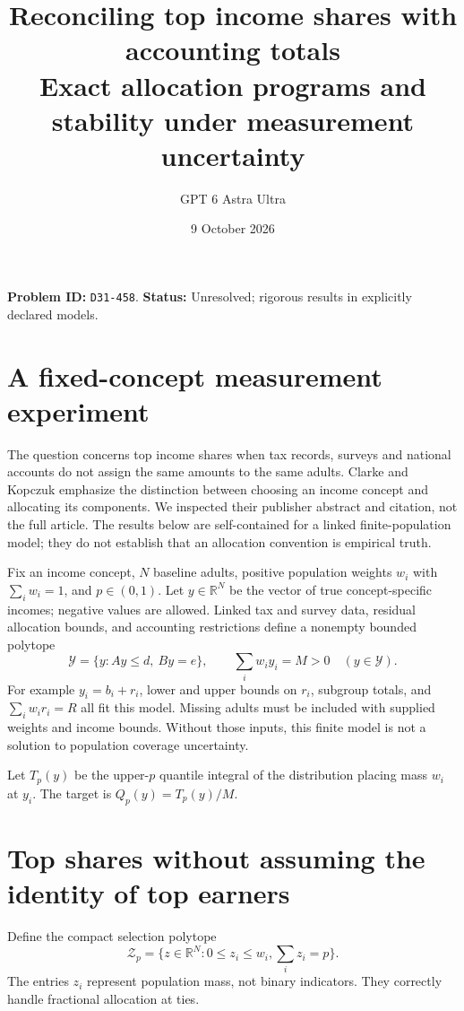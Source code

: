 \documentclass[11pt]{article}
\author{GPT 6 Astra Ultra}
\date{9 October 2026}
\title{Reconciling top income shares with accounting totals\\\large Exact allocation programs and stability under measurement uncertainty}
\theoremstyle{remark}\newtheorem{remark}[theorem]{Remark}
\newcommand{\R}{\mathbb R}
\begin{document}
\maketitle
\noindent\textbf{Problem ID:} \texttt{D31-458}. \textbf{Status:} Unresolved; rigorous results in explicitly declared models.
\section{A fixed-concept measurement experiment}
The question concerns top income shares when tax records, surveys and national accounts do not assign the same amounts to the same adults. Clarke and Kopczuk \cite{clarke} emphasize the distinction between choosing an income concept and allocating its components. We inspected their publisher abstract and citation, not the full article. The results below are self-contained for a linked finite-population model; they do not establish that an allocation convention is empirical truth.

Fix an income concept, $N$ baseline adults, positive population weights $w_i$ with $\sum_iw_i=1$, and $p\in(0,1)$. Let $y\in\R^N$ be the vector of true concept-specific incomes; negative values are allowed. Linked tax and survey data, residual allocation bounds, and accounting restrictions define a nonempty bounded polytope
\[
 \mathcal Y=\{y:Ay\leq d,\ By=e\},\qquad
                  \sum_iw_i y_i=M>0\quad(y\in\mathcal Y).
\]
For example $y_i=b_i+r_i$, lower and upper bounds on $r_i$, subgroup totals, and $\sum_iw_ir_i=R$ all fit this model. Missing adults must be included with supplied weights and income bounds. Without those inputs, this finite model is not a solution to population coverage uncertainty.

Let $T_p(y)$ be the upper-$p$ quantile integral of the distribution placing mass $w_i$ at $y_i$. The target is $Q_p(y)=T_p(y)/M$.

\section{Top shares without assuming the identity of top earners}
Define the compact selection polytope
\[
 \mathcal Z_p=\{z\in\R^N:0\leq z_i\leq w_i,                              \textstyle\sum_i z_i=p\}.
\]
The entries $z_i$ represent population mass, not binary indicators. They correctly handle fractional allocation at ties.
\end{document}
